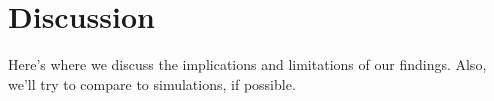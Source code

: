 \chapter{Discussion}
\label{chap:Discussion}
Here's where we discuss the implications and limitations of our
findings. Also, we'll try to compare to simulations, if possible.
